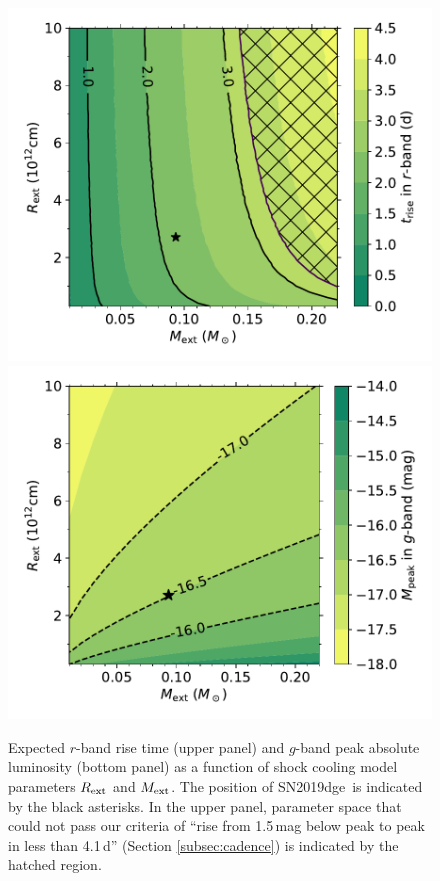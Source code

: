 \documentclass[twocolumn]{aastex63}
\newcommand{\name}{SN2019dge}
\begin{document}
\begin{CJK*}{UTF8}{gbsn}
\begin{figure}[htbp!]
	\centering
	\includegraphics[width=\columnwidth]{figures/cooling_trise.pdf}
	\includegraphics[width=\columnwidth]{figures/cooling_Mpeak.pdf}
	\caption{Expected $r$-band rise time (upper panel) and $g$-band peak absolute luminosity (bottom 
	panel) as a function of shock cooling model parameters $R_{\rm ext}$ and $M_{\rm ext}$. The 
	position of 
	\name\	is 	indicated by the black asterisks. In the upper panel, parameter space that could not pass 
	our criteria of ``rise from 1.5\,mag below peak to peak in less than 4.1\,d'' (Section 
	\ref{subsec:cadence}) is indicated by the hatched region. \label{fig:cooling}}
\end{figure}


\end{CJK*}
\end{document}
